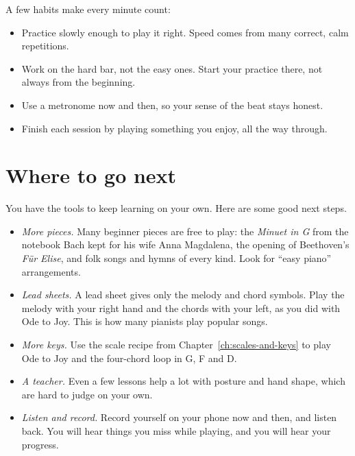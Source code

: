 A few habits make every minute count:
\begin{itemize}
  \item Practice slowly enough to play it right. Speed comes from many correct, calm repetitions.
  \item Work on the hard bar, not the easy ones. Start your practice there, not always from the beginning.
  \item Use a metronome now and then, so your sense of the beat stays honest.
  \item Finish each session by playing something you enjoy, all the way through.
\end{itemize}

\section{Where to go next}

You have the tools to keep learning on your own. Here are some good next steps.
\begin{itemize}
  \item \emph{More pieces.} Many beginner pieces are free to play: the \emph{Minuet in G} from the notebook Bach kept for his wife Anna Magdalena, the opening of Beethoven's \emph{Für Elise}, and folk songs and hymns of every kind. Look for ``easy piano'' arrangements.
  \item \emph{Lead sheets.} A lead sheet gives only the melody and chord symbols. Play the melody with your right hand and the chords with your left, as you did with Ode to Joy. This is how many pianists play popular songs.
  \item \emph{More keys.} Use the scale recipe from Chapter~\ref{ch:scales-and-keys} to play Ode to Joy and the four-chord loop in G, F and D.
  \item \emph{A teacher.} Even a few lessons help a lot with posture and hand shape, which are hard to judge on your own.
  \item \emph{Listen and record.} Record yourself on your phone now and then, and listen back. You will hear things you miss while playing, and you will hear your progress.
\end{itemize}

